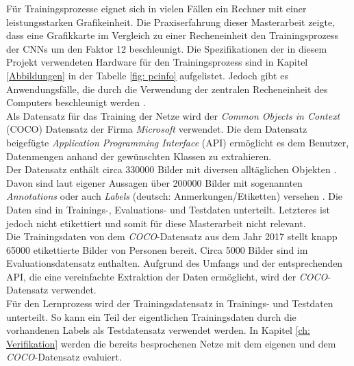 		Für Trainingsprozesse eignet sich in vielen Fällen ein Rechner mit einer leistungsstarken Grafikeinheit. Die Praxiserfahrung dieser Masterarbeit zeigte, dass eine Grafikkarte im Vergleich zu einer Recheneinheit den Trainingsprozess der CNNs um den Faktor 12 beschleunigt. Die Spezifikationen der in diesem Projekt verwendeten Hardware für den Trainingsprozess sind in Kapitel \ref{Abbildungen} in der Tabelle \ref{fig: pcinfo} aufgelistet. Jedoch gibt es Anwendungsfälle, die durch die Verwendung der zentralen Recheneinheit des Computers beschleunigt werden \cite{cpugpu}. \\
		
		Als Datensatz für das Training der Netze wird der \textit{Common Objects in Context} (COCO) Datensatz der Firma \textit{Microsoft} verwendet. Die dem Datensatz beigefügte \textit{Application Programming Interface} (API) ermöglicht es dem Benutzer, Datenmengen anhand der gewünschten Klassen zu extrahieren.\\
		
		Der Datensatz enthält circa 330000 Bilder mit diversen alltäglichen Objekten \cite{coco, cocopaper}. Davon sind laut eigener Aussagen über 200000 Bilder mit sogenannten \textit{Annotations} oder auch \textit{Labels} (deutsch: Anmerkungen/Etiketten) versehen \cite{coco}. Die Daten sind in Trainings-, Evaluations- und Testdaten unterteilt. Letzteres ist jedoch nicht etikettiert und somit für diese Masterarbeit nicht relevant.\\
		
		Die Trainingsdaten von dem \textit{COCO}-Datensatz aus dem Jahr 2017 stellt knapp 65000 etikettierte Bilder von Personen bereit. Circa 5000 Bilder sind im Evaluationsdatensatz enthalten. Aufgrund des Umfangs und der entsprechenden API, die eine vereinfachte Extraktion der Daten ermöglicht, wird der \textit{COCO}-Datensatz verwendet. \\
		
		Für den Lernprozess wird der Trainingsdatensatz in Trainings- und Testdaten unterteilt. So kann ein Teil der eigentlichen Trainingsdaten durch die vorhandenen Labels als Testdatensatz verwendet werden. In Kapitel \ref{ch: Verifikation} werden die bereits besprochenen Netze mit dem eigenen und dem \textit{COCO}-Datensatz evaluiert.
		
